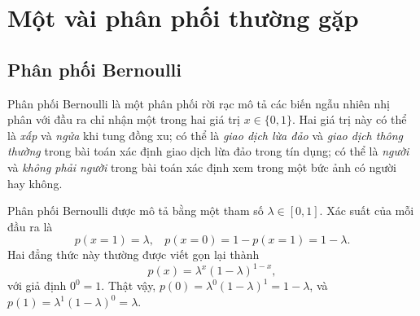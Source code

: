  

\section{Một vài phân phối thường gặp}
\subsection{Phân phối Bernoulli}

Phân phối Bernoulli là một phân phối rời rạc mô tả các biến ngẫu nhiên nhị
phân với đầu ra chỉ nhận một trong hai giá trị $x \in \{0, 1\}$. Hai giá trị
này có thể là \textit{xấp} và \textit{ngửa} khi tung đồng xu; có thể là
\textit{giao dịch lừa đảo} và \textit{giao dịch thông thường} trong bài toán
xác
định giao dịch lừa đảo trong tín dụng; có thể là \textit{người} và \textit{không
phải người} trong bài toán xác định xem trong một bức ảnh có người hay không.

Phân phối Bernoulli được mô tả bằng một tham số $\lambda \in [0, 1]$. Xác suất của mỗi đầu ra là
\begin{equation}
\label{eqn:30_29}
  p(x = 1) = \lambda, ~~~~ p(x = 0) = 1 - p(x = 1) = 1 - \lambda.
\end{equation}
Hai đẳng thức này thường được viết gọn lại thành 
\begin{equation}
\label{eqn:30_292}
  p(x) = \lambda^x (1 - \lambda)^{1 - x},
\end{equation}
với giả định $0 ^0 = 1$. Thật vậy, $p(0) = \lambda^0 (1 - \lambda)^1 = 1 -
\lambda$, và $p(1) = \lambda^1 (1 - \lambda)^0 = \lambda$.


